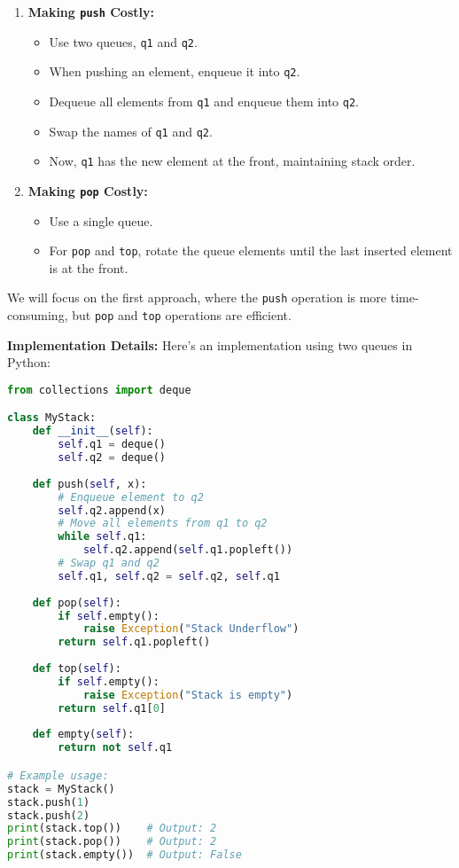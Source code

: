 \begin{enumerate}
    \item \textbf{Making \texttt{push} Costly:}
        \begin{itemize}
            \item Use two queues, \texttt{q1} and \texttt{q2}.
            \item When pushing an element, enqueue it into \texttt{q2}.
            \item Dequeue all elements from \texttt{q1} and enqueue them into \texttt{q2}.
            \item Swap the names of \texttt{q1} and \texttt{q2}.
            \item Now, \texttt{q1} has the new element at the front, maintaining stack order.
        \end{itemize}
    \item \textbf{Making \texttt{pop} Costly:}
        \begin{itemize}
            \item Use a single queue.
            \item For \texttt{pop} and \texttt{top}, rotate the queue elements until the last inserted element is at the front.
        \end{itemize}
\end{enumerate}

We will focus on the first approach, where the \texttt{push} operation is more time-consuming, but \texttt{pop} and \texttt{top} operations are efficient.

\textbf{Implementation Details:}  
Here's an implementation using two queues in Python:

\begin{fullwidth}
\begin{lstlisting}[language=Python]
from collections import deque

class MyStack:
    def __init__(self):
        self.q1 = deque()
        self.q2 = deque()
    
    def push(self, x):
        # Enqueue element to q2
        self.q2.append(x)
        # Move all elements from q1 to q2
        while self.q1:
            self.q2.append(self.q1.popleft())
        # Swap q1 and q2
        self.q1, self.q2 = self.q2, self.q1
    
    def pop(self):
        if self.empty():
            raise Exception("Stack Underflow")
        return self.q1.popleft()
    
    def top(self):
        if self.empty():
            raise Exception("Stack is empty")
        return self.q1[0]
    
    def empty(self):
        return not self.q1

# Example usage:
stack = MyStack()
stack.push(1)
stack.push(2)
print(stack.top())    # Output: 2
print(stack.pop())    # Output: 2
print(stack.empty())  # Output: False
\end{lstlisting}
\end{fullwidth}

